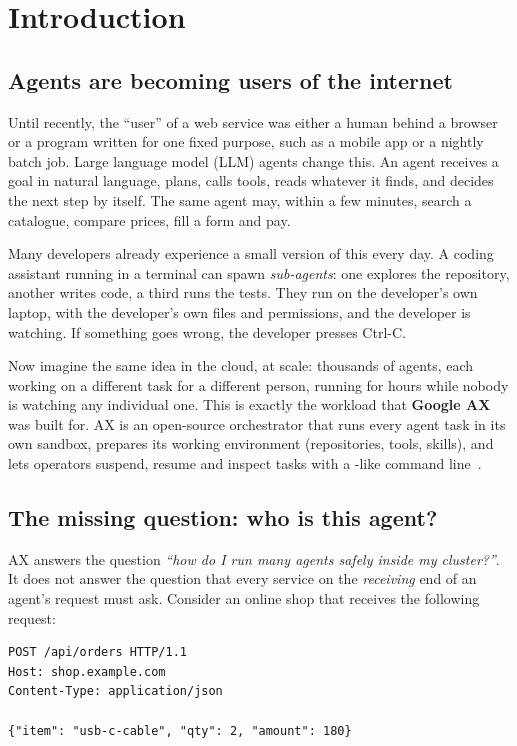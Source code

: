 \section{Introduction}

\subsection{Agents are becoming users of the internet}

Until recently, the ``user'' of a web service was either a human behind a browser or a program written for one fixed purpose, such as a mobile app or a nightly batch job. Large language model (LLM) agents change this. An agent receives a goal in natural language, plans, calls tools, reads whatever it finds, and decides the next step by itself. The same agent may, within a few minutes, search a catalogue, compare prices, fill a form and pay.

Many developers already experience a small version of this every day. A coding assistant running in a terminal can spawn \emph{sub-agents}: one explores the repository, another writes code, a third runs the tests. They run on the developer's own laptop, with the developer's own files and permissions, and the developer is watching. If something goes wrong, the developer presses Ctrl-C.

Now imagine the same idea in the cloud, at scale: thousands of agents, each working on a different task for a different person, running for hours while nobody is watching any individual one. This is exactly the workload that \textbf{Google AX} was built for. AX is an open-source orchestrator that runs every agent task in its own sandbox, prepares its working environment (repositories, tools, skills), and lets operators suspend, resume and inspect tasks with a -like command line~\cite{ax}.

\subsection{The missing question: who is this agent?}

AX answers the question \emph{``how do I run many agents safely inside my cluster?''}. It does not answer the question that every service on the \emph{receiving} end of an agent's request must ask. Consider an online shop that receives the following request:

\begin{lstlisting}[language=http]
POST /api/orders HTTP/1.1
Host: shop.example.com
Content-Type: application/json

{"item": "usb-c-cable", "qty": 2, "amount": 180}
\end{lstlisting}

